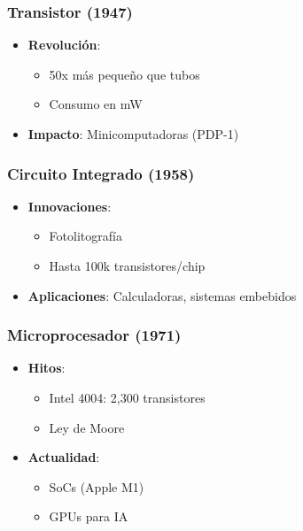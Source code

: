 \documentclass[]{article}
\begin{document}
\subsubsection{Transistor (1947)}
\begin{itemize}
\item \textbf{Revolución}:
  \begin{itemize}
  \item 50x más pequeño que tubos \cite{shockley1950}
  \item Consumo en mW \cite{bell2010}
  \end{itemize}
\item \textbf{Impacto}: Minicomputadoras (PDP-1) \cite{ceruzzi2003}
\end{itemize}

\subsubsection{Circuito Integrado (1958)}
\begin{itemize}
\item \textbf{Innovaciones}:
  \begin{itemize}
  \item Fotolitografía \cite{kilby1964}
  \item Hasta 100k transistores/chip \cite{moore1965}
  \end{itemize}
\item \textbf{Aplicaciones}: Calculadoras, sistemas embebidos \cite{rodriguez2007}
\end{itemize}

\subsubsection{Microprocesador (1971)}
\begin{itemize}
\item \textbf{Hitos}:
  \begin{itemize}
  \item Intel 4004: 2,300 transistores \cite{faggin1996}
  \item Ley de Moore \cite{moore1965}
  \end{itemize}
\item \textbf{Actualidad}:
  \begin{itemize}
  \item SoCs (Apple M1) \cite{apple2020}
  \item GPUs para IA \cite{nvidia2021}
  \end{itemize}
\end{itemize}
\end{document}
